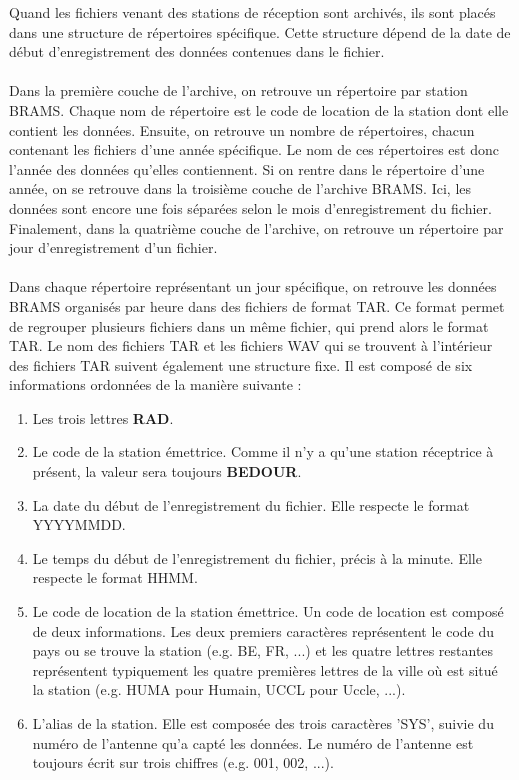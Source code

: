 \documentclass[11pt]{article}
\begin{document}
Quand les fichiers venant des stations de réception sont archivés, ils sont placés dans une structure de répertoires spécifique.
Cette structure dépend de la date de début d'enregistrement des données contenues dans le fichier.\\
\\
Dans la première couche de l'archive, on retrouve un répertoire par station BRAMS.
Chaque nom de répertoire est le code de location de la station dont elle contient les données.
Ensuite, on retrouve un nombre de répertoires, chacun contenant les fichiers d'une année spécifique.
Le nom de ces répertoires est donc l'année des données qu'elles contiennent.
Si on rentre dans le répertoire d'une année, on se retrouve dans la troisième couche de l'archive BRAMS.
Ici, les données sont encore une fois séparées selon le mois d'enregistrement du fichier.
Finalement, dans la quatrième couche de l'archive, on retrouve un répertoire par jour d'enregistrement d'un fichier.\\
\\
Dans chaque répertoire représentant un jour spécifique, on retrouve les données BRAMS organisés par heure dans des fichiers de format TAR.
Ce format permet de regrouper plusieurs fichiers dans un même fichier, qui prend alors le format TAR.
Le nom des fichiers TAR et les fichiers WAV qui se trouvent à l'intérieur des fichiers TAR suivent également une structure fixe.
Il est composé de six informations ordonnées de la manière suivante :
\begin{enumerate}
    \item Les trois lettres \textbf{RAD}.
    \item Le code de la station émettrice.
          Comme il n'y a qu'une station réceptrice à présent, la valeur sera toujours \textbf{BEDOUR}.
    \item La date du début de l'enregistrement du fichier.
          Elle respecte le format YYYYMMDD.
    \item Le temps du début de l'enregistrement du fichier, précis à la minute.
          Elle respecte le format HHMM.
    \item Le code de location de la station émettrice.
          Un code de location est composé de deux informations.
          Les deux premiers caractères représentent le code du pays ou se trouve la station (e.g. BE, FR, ...) et les quatre lettres restantes représentent typiquement les quatre premières lettres de la ville où est situé la station (e.g. HUMA pour Humain, UCCL pour Uccle, ...).
    \item L'alias de la station.
          Elle est composée des trois caractères 'SYS', suivie du numéro de l'antenne qu'a capté les données.
          Le numéro de l'antenne est toujours écrit sur trois chiffres (e.g. 001, 002, ...).
\end{enumerate}
\end{document}
